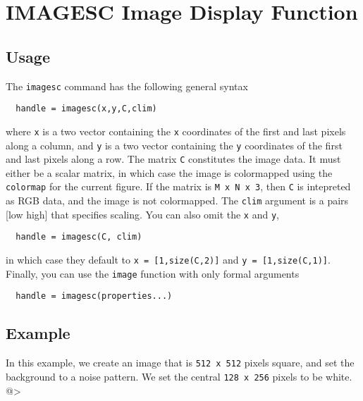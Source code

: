 \section{IMAGESC Image Display Function}

\subsection{Usage}

The \verb|imagesc| command has the following general syntax
\begin{verbatim}
  handle = imagesc(x,y,C,clim)
\end{verbatim}
where \verb|x| is a two vector containing the \verb|x| coordinates
of the first and last pixels along a column, and \verb|y| is a
two vector containing the \verb|y| coordinates of the first and
last pixels along a row.  The matrix \verb|C| constitutes the
image data.  It must either be a scalar matrix, in which case
the image is colormapped using the  \verb|colormap| for the current
figure.  If the matrix is \verb|M x N x 3|, then \verb|C| is intepreted
as RGB data, and the image is not colormapped.  The \verb|clim|
argument is a pairs [low high] that specifies scaling.  You can 
also omit the \verb|x| and \verb|y|, 
\begin{verbatim}
  handle = imagesc(C, clim)
\end{verbatim}
in which case they default to \verb|x = [1,size(C,2)]| and 
\verb|y = [1,size(C,1)]|.  Finally, you can use the \verb|image| function
with only formal arguments
\begin{verbatim}
  handle = imagesc(properties...)
\end{verbatim}

\subsection{Example}

In this example, we create an image that is \verb|512 x 512| pixels
square, and set the background to a noise pattern.  We set the central
\verb|128 x 256| pixels to be white.
@>

